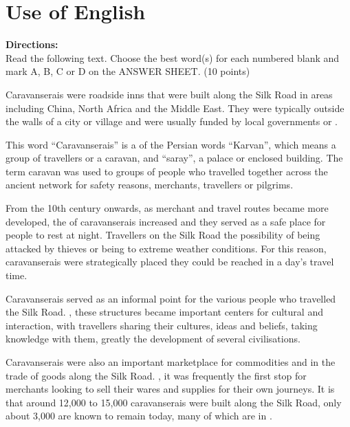

\section{Use of English}

\noindent
\textbf{Directions:}\\
Read the following text. Choose the best word(s) for each numbered blank
and mark A, B, C or D on the
ANSWER SHEET. (10 points)

\TiGanSpace

Caravanserais were roadside inns that were built along the Silk Road in areas including China, North Africa and the Middle East. They were typically  \cloze  outside the walls of a city or village and were usually funded by local governments or \cloze .


This word ``Caravanserais'' is a \cloze of the Persian words ``Karvan'', which means a group of travellers or a caravan, and ``saray'', a palace or enclosed building. The term caravan was used to \cloze groups of people who travelled together across the ancient network for safety reasons, \cloze merchants, travellers or pilgrims.


From the 10th century onwards, as merchant and travel routes became more developed, the \cloze of caravanserais increased and they served as a safe place for people to rest at night. Travellers on the Silk Road \cloze the possibility of being attacked by thieves or being \cloze to extreme weather conditions. For this reason, caravanserais were strategically placed \cloze they could be reached in a day's travel time.

Caravanserais served as an informal \cloze point for the various people who travelled the Silk Road. \cloze , these structures became important centers for cultural \cloze and interaction, with travellers sharing their cultures, ideas and beliefs, \cloze taking knowledge with them, greatly \cloze the development of several civilisations.


Caravanserais were also an important marketplace for commodities and \cloze in the trade of goods along the Silk Road. \cloze , it was frequently the first stop for merchants looking to sell their wares and \cloze supplies for their own journeys. It is \cloze that around 12,000 to 15,000 caravanserais were built along the Silk Road, \cloze only about 3,000 are known to remain today, many of which are in \cloze .

\newpage

